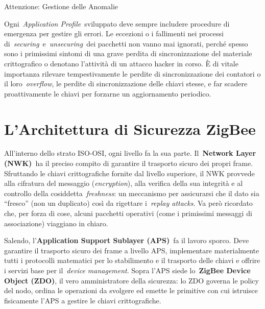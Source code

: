 \documentclass[
  italian,
  openany]{book}
\begin{document}
\begin{calloutwarning}{Attenzione: Gestione delle Anomalie}

Ogni~\emph{Application Profile}~sviluppato deve sempre includere
procedure di emergenza per gestire gli errori. Le eccezioni o i
fallimenti nei processi di~\emph{securing}~e~\emph{unsecuring}~dei
pacchetti non vanno mai ignorati, perché spesso sono i primissimi
sintomi di una grave perdita di sincronizzazione del materiale
crittografico o denotano l'attività di un attacco hacker in corso. È di
vitale importanza rilevare tempestivamente le perdite di
sincronizzazione dei contatori o il loro~\emph{overflow}, le perdite di
sincronizzazione delle chiavi stesse, e far scadere proattivamente le
chiavi per forzarne un aggiornamento periodico.

\end{calloutwarning}

\section{L'Architettura di Sicurezza
ZigBee}\label{larchitettura-di-sicurezza-zigbee}

All'interno dello strato ISO-OSI, ogni livello fa la sua parte.
Il~\textbf{Network Layer (NWK)}~ha il preciso compito di garantire il
trasporto sicuro dei propri frame. Sfruttando le chiavi crittografiche
fornite dal livello superiore, il NWK provvede alla cifratura del
messaggio (\emph{encryption}), alla verifica della sua integrità e al
controllo della cosiddetta~\emph{freshness}: un meccanismo per
assicurarsi che il dato sia ``fresco'' (non un duplicato) così da
rigettare i~\emph{replay attacks}. Va però ricordato che, per forza di
cose, alcuni pacchetti operativi (come i primissimi messaggi di
associazione) viaggiano in chiaro.

Salendo, l'\textbf{Application Support Sublayer (APS)}~fa il lavoro
sporco. Deve garantire il trasporto sicuro dei frame a livello APS,
implementare materialmente tutti i protocolli matematici per lo
stabilimento e il trasporto delle chiavi e offrire i servizi base per
il~\emph{device management}. Sopra l'APS siede lo~\textbf{ZigBee Device
Object (ZDO)}, il vero amministratore della sicurezza: lo ZDO governa le
policy del nodo, ordina le operazioni da svolgere ed emette le primitive
con cui istruisce fisicamente l'APS a gestire le chiavi crittografiche.
\end{document}
